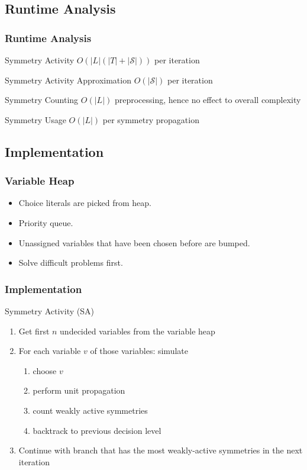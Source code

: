 \documentclass{beamer}
\begin{document}
	\subsection{Runtime Analysis}
	\begin{frame}
		\frametitle{Runtime Analysis}

		\begin{block}{Symmetry Activity}
			$O(|L|(|T| + |\mathcal{S}|))$ per iteration
		\end{block}
		\begin{block}{Symmetry Activity Approximation}
			$O(|\mathcal{S}|)$ per iteration
		\end{block}
		\begin{block}{Symmetry Counting}
			$O(|L|)$ preprocessing, hence no effect to overall complexity
		\end{block}
		\begin{block}{Symmetry Usage}
			$O(|L|)$ per symmetry propagation
		\end{block}
	\end{frame}
	
	\subsection{Implementation}
	\begin{frame}
		\frametitle{Variable Heap}

		\begin{itemize}
			\item Choice literals are picked from heap.
			\item Priority queue.
			\item Unassigned variables that have been chosen before are bumped.
			\item Solve difficult problems first.
		\end{itemize}
	\end{frame}

	\begin{frame}%
		\frametitle{Implementation}

		\begin{block}{Symmetry Activity (SA)}
			\begin{enumerate}
				\item Get first $n$ undecided variables from the variable heap
				\item For each variable $v$ of those variables: simulate
						\begin{enumerate}
							\item choose $v$
							\item perform unit propagation
							\item count weakly active symmetries
							\item backtrack to previous decision level
						\end{enumerate}
				\item Continue with branch that has the most weakly-active symmetries in the next
					iteration
			\end{enumerate}
		\end{block}
	\end{frame}
\end{document}
